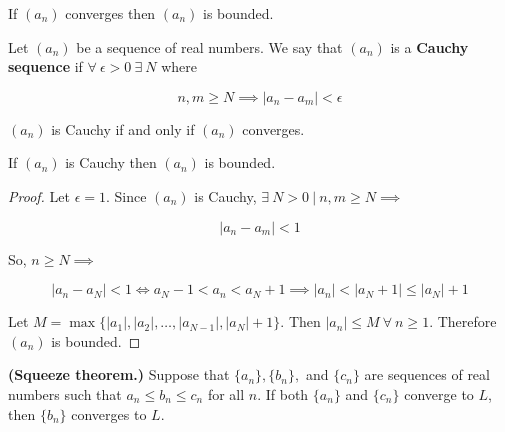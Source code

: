 \begin{theorem} If \((a_n)\) converges then \((a_n)\) is bounded. \end{theorem}

\begin{definition} Let \((a_n)\) be a sequence of real numbers. We say that \((a_n)\) is a \textbf{Cauchy sequence} if \(\forall \ \epsilon > 0 \ \exists \ N\) where

\[
n, m \geq N \implies |a_n - a_m| < \epsilon
\]

\end{definition}

\begin{theorem} \((a_n)\) is Cauchy if and only if \((a_n)\) converges.

\end{theorem}

\begin{corollary} If \((a_n)\) is Cauchy then \((a_n)\) is bounded.

\end{corollary}


\begin{proof} Let \(\epsilon = 1\). Since \((a_n)\) is Cauchy, \(\exists \ N > 0 \ | \ n, m \geq N \implies \)

\[
|a_n - a_m| < 1
\]

So, \(n \geq N \implies\)

\[
|a_n - a_N| < 1 \iff a_N - 1 < a_n < a_N + 1 \implies |a_n| < |a_N + 1| \leq |a_N| + 1
\]

Let \(M = \max \{ |a_1|, |a_2|, \ldots, |a_{N-1}|, |a_N| + 1\} \). Then \(|a_n| \leq  M \ \forall \ n \geq 1 \). Therefore \((a_n)\) is bounded.

\end{proof}


\begin{theorem} \textbf{(Squeeze theorem.)} Suppose that \(\{a_n\}, \{b_n\},\) and \(\{c_n\}\) are sequences of real numbers such that \(a_n \leq b_n \leq c_n\) for all \(n\). If both \(\{a_n\}\) and \(\{c_n\}\) converge to \(L\), then \(\{b_n\}\) converges to \(L\).

\end{theorem}

